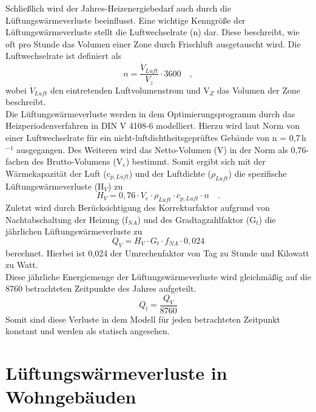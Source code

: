 Schließlich wird der Jahres-Heizenergiebedarf auch durch die Lüftungswärmeverluste beeinflusst.
Eine wichtige Kenngröße der Lüftungswärmeverluste stellt die Luftwechselrate (n) dar.
Diese beschreibt, wie oft pro Stunde das Volumen einer Zone durch Frischluft ausgetauscht wird.
Die Luftwechselrate ist definiert als
\begin{equation}
\label{eq:Gleichun330}
n = \frac{\Dot{V}_{Luft}}{V_z} \cdot 3600 \quad,
\end{equation}
wobei \(\Dot{V}_{Luft}\) den eintretenden Luftvolumenstrom und V\(_Z\) das Volumen der Zone beschreibt.\\
Die Lüftungswärmeverluste werden in dem Optimierungsprogramm durch das Heizperiodenverfahren in DIN V 4108-6 \cite{DeutschesInstitutfurNormunge.V..Juni2003} modelliert.
Hierzu wird laut Norm von einer Luftwechselrate für ein nicht-luftdichtheitsgeprüftes Gebäude von n = 0,7\,h\(^{-1}\) ausgegangen. 
Des Weiteren wird das Netto-Volumen (V) in der Norm als 0,76-fachen des Brutto-Volumens (V\(_e\)) bestimmt.
Somit ergibt sich mit der Wärmekapazität der Luft (c\(_{p, Luft}\)) und der Luftdichte (\(\rho_{Luft}\)) die spezifische Lüftungswärmeverluste (H\(_V\)) zu
\begin{equation}
\label{eq:Gleichung328}
H_V = 0,76 \cdot V_e \cdot \rho_{Luft} \cdot c_{p, Luft} \cdot n \quad \text{.}
\end{equation}
Zuletzt wird durch Berücksichtigung des Korrekturfaktor aufgrund von Nachtabschaltung der Heizung (f\(_{NA}\)) und des Gradtagzahlfaktor (G\(_t\)) die jährlichen Lüftungswärmeverluste zu
\begin{equation}
\label{eq:Gleichung329}
Q_{V} = H_V \cdot G_t \cdot f_{NA} \cdot 0,024
\end{equation}
berechnet.
Hierbei ist 0,024 der Umrechenfaktor von Tag zu Stunde und Kilowatt zu Watt.\\
Diese jährliche Energiemenge der Lüftungswärmeverluste wird gleichmäßig auf die 8760 betrachteten Zeitpunkte des Jahres aufgeteilt.
\begin{equation}
\label{eq:Gleichung3291}
Q_l = \frac{Q_{V}}{8760}
\end{equation}
Somit sind diese Verluste in dem Modell für jeden betrachteten Zeitpunkt konstant und werden als statisch angesehen.

\section{Lüftungswärmeverluste in Wohngebäuden}
\label{sec:Sektion 33}

